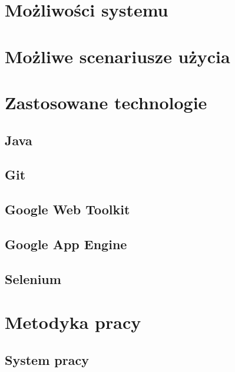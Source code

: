 \documentclass{pracamgr}
\begin{document}
%
%
\chapter{Możliwości systemu}

%
%
\chapter{Możliwe scenariusze użycia}


%
%
\chapter{Zastosowane technologie}

\section{Java}
\section{Git}
\section{Google Web Toolkit}
\section{Google App Engine}
\section{Selenium}

%
%
\chapter{Metodyka pracy}

%
%
\section{System pracy}
\end{document}
